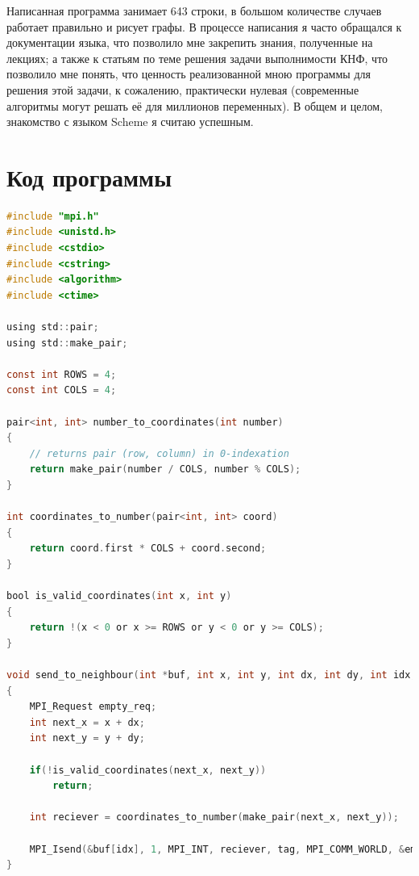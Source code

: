 \documentclass[12pt]{article}
\begin{document}
 \pagebreak
        Написанная программа занимает 643 строки, в большом количестве случаев работает правильно и рисует графы. В процессе
        написания я часто обращался к документации языка, что позволило мне закрепить знания, полученные на лекциях; а также к статьям по теме решения задачи выполнимости КНФ,
        что позволило мне понять, что ценность реализованной мною программы для решения этой задачи, к сожалению,
        практически нулевая (современные алгоритмы могут решать её для миллионов
        переменных). В общем и целом, знакомство с языком Scheme я считаю успешным. 

        
        \pagebreak

\appendix
\section{Код программы}

\begin{lstlisting}[language=C]
#include "mpi.h"
#include <unistd.h>
#include <cstdio>
#include <cstring>
#include <algorithm>
#include <ctime>

using std::pair;
using std::make_pair;

const int ROWS = 4;
const int COLS = 4;

pair<int, int> number_to_coordinates(int number)
{
    // returns pair (row, column) in 0-indexation
    return make_pair(number / COLS, number % COLS);
}

int coordinates_to_number(pair<int, int> coord)
{
    return coord.first * COLS + coord.second;
}

bool is_valid_coordinates(int x, int y)
{
    return !(x < 0 or x >= ROWS or y < 0 or y >= COLS);
}

void send_to_neighbour(int *buf, int x, int y, int dx, int dy, int idx, int tag)
{
    MPI_Request empty_req;
    int next_x = x + dx;
    int next_y = y + dy;

    if(!is_valid_coordinates(next_x, next_y))
        return;
    
    int reciever = coordinates_to_number(make_pair(next_x, next_y));

    MPI_Isend(&buf[idx], 1, MPI_INT, reciever, tag, MPI_COMM_WORLD, &empty_req); 
}
\end{lstlisting}
\end{document}
